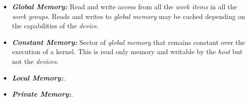 \begin{itemize}
    \item\textbf{\textit{Global Memory:}} Read and write access from all the \emph{work items} in all the \emph{work groups}. Reads
        and writes to \emph{global memory} may be cached depending on the capabilities of the \emph{device}\cite{opencl12}.

    \item\textbf{\textit{Constant Memory:}} Sector of \emph{global memory} that remains constant over the execution of a kernel.
        This is read only memory and writable by the \emph{host} but not the \emph{devices}\cite{wikipedia_opencl,opencl12}.

    \item\textbf{\textit{Local Memory:}}.
    \item\textbf{\textit{Private Memory:}}.
\end{itemize}


